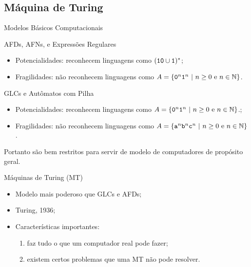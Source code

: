 \documentclass[xcolor=dvipsnames,table]{beamer}
\begin{document}
	\subsection{Máquina de Turing}
	\begin{frame}{Modelos Básicos Computacionais}
		\begin{block}{AFDs, AFNs, e Expressões Regulares}
			\begin{itemize}
				\item Potencialidades: reconhecem linguagens como $({\tt 10} \cup {\tt 1})^*$;
				\item Fragilidades: não reconhecem linguagens como $A = \{ {\tt 0}^n {\tt 1}^n \mbox{ | } n \geq 0 \mbox{ e } n \in \mathbb{N} \}$.
			\end{itemize}
		\end{block} \pause
		\begin{block}{GLCs e Autômatos com Pilha}
			\begin{itemize}
				\item Potencialidades: reconhecem linguagens como $A = \{ {\tt 0}^n {\tt 1}^n \mbox{ | } n \geq 0 \mbox{ e } n \in \mathbb{N} \}$.;
				\item Fragilidades: não reconhecem linguagens como $A = \{ {\tt a}^n {\tt b}^n {\tt c}^n\mbox{ | } n \geq 0 \mbox{ e } n \in \mathbb{N} \}$.
			\end{itemize}
		\end{block} \pause
		\begin{alertblock}{}
			Portanto são bem restritos para servir de modelo de computadores de propósito geral.
		\end{alertblock}
	\end{frame}
	
	\begin{frame}{Máquinas de Turing (MT)}
		\begin{itemize}
			\item Modelo mais poderoso que GLCs e AFDs; 
			\item Turing, 1936; 
			\item Características importantes:
				\begin{enumerate}
					\item faz tudo o que um computador real pode fazer;
					\item existem certos problemas que uma MT não pode resolver.
				\end{enumerate}				 
			
		\end{itemize}
	\end{frame}
	
\end{document}
